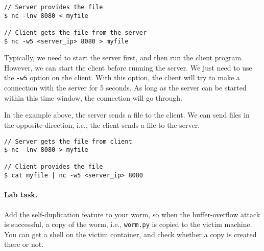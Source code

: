 \begin{lstlisting}
// Server provides the file
$ nc -lnv 8080 < myfile

// Client gets the file from the server
$ nc -w5 <server_ip> 8080 > myfile
\end{lstlisting}
 
Typically, we need to start the server first, and then 
run the client program. However, we can start the client 
before running the server. We just need to use 
the \texttt{-w5} option on the client. 
With this option, the client will try to make a connection with
the server for 5 seconds. As long as the server can be started 
within this time window, the connection will go through.

In the example above, the server sends a file to the client.
We can send files in the opposite direction, i.e., the client
sends a file to the server. 

\begin{lstlisting}
// Server gets the file from client
$ nc -lnv 8080 > myfile

// Client provides the file
$ cat myfile | nc -w5 <server_ip> 8080
\end{lstlisting}
 

\paragraph{Lab task.} 
Add the self-duplication feature to your worm, so when
the buffer-overflow attack is successful, a copy of the 
worm, i.e., \texttt{worm.py} is copied to the 
victim machine. You can get a shell on the victim container,
and check whether a copy is created there or not.









